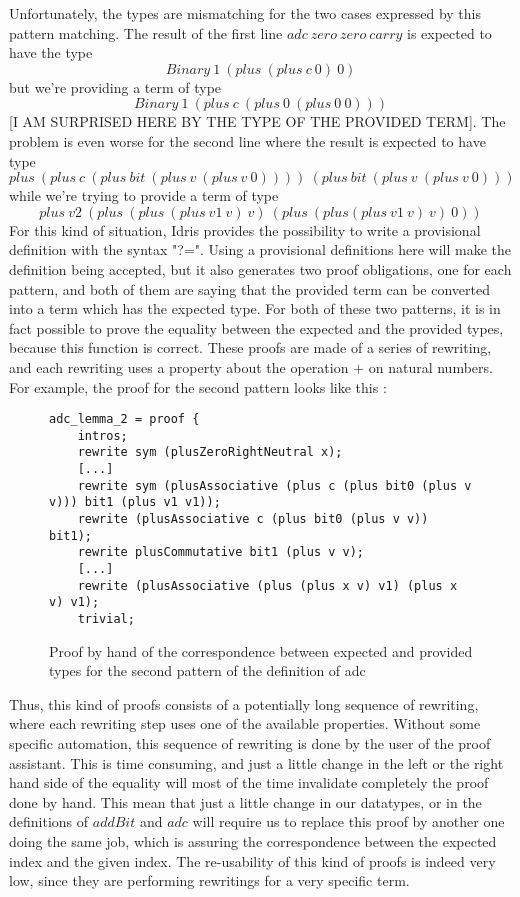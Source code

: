 Unfortunately, the types are mismatching for the two cases expressed by this pattern matching. The result of the first line $adc\ zero\ zero\ carry$ is expected to have the type\[Binary\ 1\ (plus\ (plus\ c\ 0)\ 0)\] but we're providing a term of type \[Binary\ 1\ (plus\ c\ (plus\ 0\ (plus\ 0\ 0)))\] [I AM SURPRISED HERE BY THE TYPE OF THE PROVIDED TERM].
The problem is even worse for the second line where the result is expected to have type \[plus\ (plus\ c\ (plus\ bit\ (plus\ v\ (plus\ v\ 0))))\ (plus\ bit\ (plus\ v\ (plus\ v\ 0)))\] while we're trying to provide a term of type \[plus\ v2\ (plus\ (plus\ (plus\ v1\ v)\ v)\ (plus\ (plus (plus\ v1\ v)\ v)\ 0))\]
For this kind of situation, Idris provides the possibility to write a provisional definition with the syntax "?=". Using a provisional definitions here will make the definition being accepted, but it also generates two proof obligations, one for each pattern, and both of them are saying that the provided term can be converted into a term which has the expected type.
For both of these two patterns, it is in fact possible to prove the equality between the expected and the provided types, because this function is correct. These proofs are made of a series of rewriting, and each rewriting uses a property about the operation $+$ on natural numbers.
For example, the proof for the second pattern looks like this :
\begin{figure}[H]
\figrule
\begin{center}
\begin{verbatim}
adc_lemma_2 = proof {
    intros;
    rewrite sym (plusZeroRightNeutral x);
    [...]
    rewrite sym (plusAssociative (plus c (plus bit0 (plus v v))) bit1 (plus v1 v1));
    rewrite (plusAssociative c (plus bit0 (plus v v)) bit1);
    rewrite plusCommutative bit1 (plus v v);
    [...]
    rewrite (plusAssociative (plus (plus x v) v1) (plus x v) v1);
    trivial;
\end{verbatim}
\end{center}
\caption{Proof by hand of the correspondence between expected and provided types for the second pattern of the definition of adc}
\figrule
\end{figure}


Thus, this kind of proofs consists of a potentially long sequence of rewriting, where each rewriting step uses one of the available properties. Without some specific automation, this sequence of rewriting is done by the user of the proof assistant. This is time consuming, and just a little change in the left or the right hand side of the equality will most of the time invalidate completely the proof done by hand. This mean that just a little change in our datatypes, or in the definitions of $addBit$ and $adc$ will require us to replace this proof by another one doing the same job, which is assuring the correspondence between the expected index and the given index. The re-usability of this kind of proofs is indeed very low, since they are performing rewritings for a very specific term.

